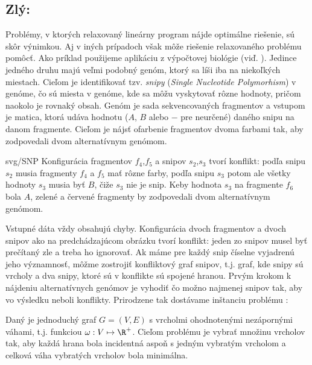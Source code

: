 \subsection*{Zlý: \minvcover}

Problémy, v ktorých relaxovaný lineárny program nájde optimálne riešenie, sú skôr výnimkou. Aj v iných prípadoch
však môže riešenie relaxovaného problému pomôcť. Ako príklad použijeme aplikáciu z výpočtovej biológie
(viď. \cite{lBILS01}). Jedince jedného druhu majú veľmi podobný genóm, ktorý sa líši iba na niekoľkých
miestach. Cieľom je identifikovať tzv. {\em snipy} ({\em Single Nucleotide Polymorhism}) v genóme,
čo sú miesta v genóme, kde sa môžu vyskytovať rôzne hodnoty, pričom naokolo je rovnaký obsah. 
Genóm je sada sekvencovaných fragmentov a vstupom je matica, ktorá udáva hodnotu ($A$, $B$ alebo $-$ pre neurčené) 
daného
snipu na danom fragmente. Cieľom je nájsť ofarbenie fragmentov dvoma farbami tak, aby zodpovedali 
dvom alternatívnym genómom.

\begin{myfig}{0.4\textwidth}{svg/SNP}
Konfigurácia fragmentov $f_4$,$f_5$ a snipov  $s_2$,$s_3$ tvorí  konflikt: 
podľa snipu $s_2$ musia fragmenty $f_4$ a $f_5$
mať rôzne farby, podľa snipu $s_3$ potom ale všetky hodnoty $s_3$ musia byť $B$, čiže $s_3$ nie je snip.
Keby hodnota $s_3$ na fragmente $f_6$ bola $A$, zelené a červené fragmenty by zodpovedali dvom 
alternatívnym genómom.
\end{myfig}

\noindent
Vstupné dáta vždy obsahujú chyby. Konfigurácia dvoch fragmentov a dvoch snipov ako na predchádzajúcom 
obrázku tvorí konflikt: jeden zo snipov musel byť prečítaný zle a treba ho ignorovať. 
Ak máme pre každý snip číselne vyjadrenú jeho významnosť, môžme zostrojiť konfliktový graf snipov, t.j.
graf, kde snipy sú vrcholy a dva snipy, ktoré sú v konflikte sú spojené hranou. Prvým krokom 
k nájdeniu alternatívnych genómov je vyhodiť
čo možno najmenej snipov tak, aby vo výsledku neboli konflikty. Prirodzene tak dostávame inštanciu
problému \minvcover:

\begin{framed}
  \begin{dfn}
    \label{dfn:minvcover}
Daný je jednoduchý graf $G=(V,E)$ s
vrcholmi ohodnotenými nezápornými váhami, t.j. funkciou $\omega:V\mapsto\R^+$.
Cieľom problému \minvcover je vybrať množinu vrcholov tak, aby každá hrana bola incidentná aspoň s
jedným vybratým vrcholom a celková váha vybratých vrcholov bola minimálna. 
\end{dfn}
\end{framed}



